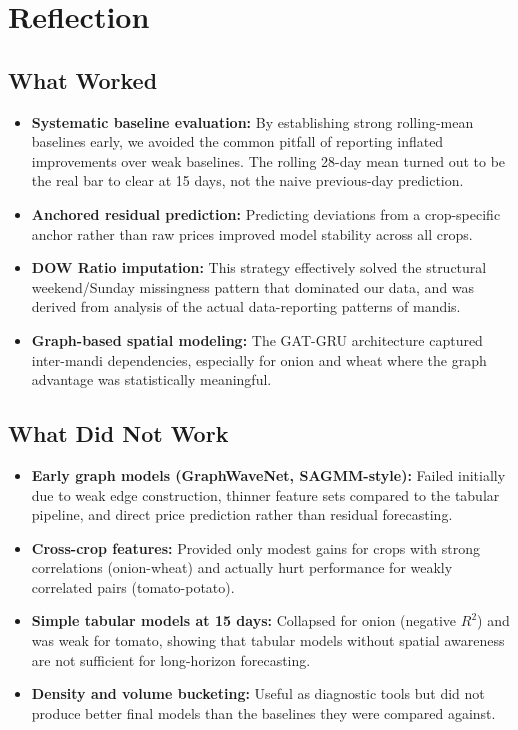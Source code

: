 \documentclass[12pt,a4paper]{article}
\begin{document}
\section{Reflection}
\subsection{What Worked}
\begin{itemize}
\item \textbf{Systematic baseline evaluation:} By establishing strong rolling-mean baselines early, we avoided the common pitfall of reporting inflated improvements over weak baselines. The rolling 28-day mean turned out to be the real bar to clear at 15 days, not the naive previous-day prediction.
\item \textbf{Anchored residual prediction:} Predicting deviations from a crop-specific anchor rather than raw prices improved model stability across all crops.
\item \textbf{DOW Ratio imputation:} This strategy effectively solved the structural weekend/Sunday missingness pattern that dominated our data, and was derived from analysis of the actual data-reporting patterns of mandis.
\item \textbf{Graph-based spatial modeling:} The GAT-GRU architecture captured inter-mandi dependencies, especially for onion and wheat where the graph advantage was statistically meaningful.
\end{itemize}
\subsection{What Did Not Work}
\begin{itemize}
\item \textbf{Early graph models (GraphWaveNet, SAGMM-style):} Failed initially due to weak edge construction, thinner feature sets compared to the tabular pipeline, and direct price prediction rather than residual forecasting.
\item \textbf{Cross-crop features:} Provided only modest gains for crops with strong correlations (onion-wheat) and actually hurt performance for weakly correlated pairs (tomato-potato).
\item \textbf{Simple tabular models at 15 days:} Collapsed for onion (negative $R^2$) and was weak for tomato, showing that tabular models without spatial awareness are not sufficient for long-horizon forecasting.
\item \textbf{Density and volume bucketing:} Useful as diagnostic tools but did not produce better final models than the baselines they were compared against.
\end{itemize}
\end{document}
